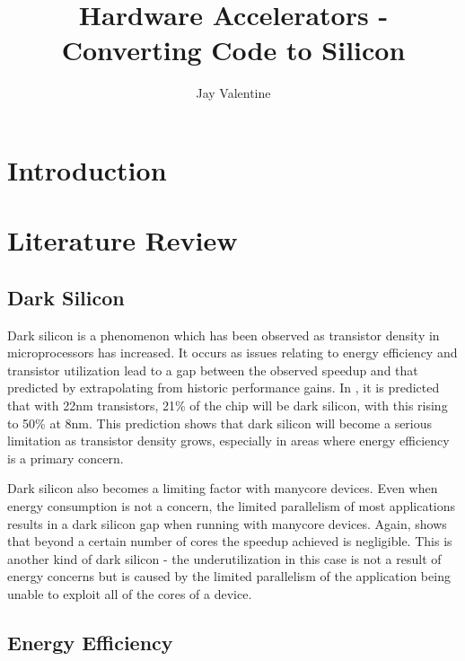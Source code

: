 \documentclass{report}
\begin{document}
\title{Hardware Accelerators - Converting Code to Silicon}
\author{Jay Valentine}

\maketitle

\begin{abstract}
\end{abstract}

\chapter*{Introduction}

\chapter*{Literature Review}

\section{Dark Silicon}

Dark silicon is a phenomenon which has been observed as transistor density in microprocessors has increased.
It occurs as issues relating to energy efficiency and transistor utilization lead to a gap between the observed speedup and that
predicted by extrapolating from historic performance gains. In \cite{darksilicon}, it is predicted that with 22nm transistors,
21\% of the chip will be dark silicon, with this rising to 50\% at 8nm. This prediction shows that dark silicon will become a
serious limitation as transistor density grows, especially in areas where energy efficiency is a primary concern.

Dark silicon also becomes a limiting factor with manycore devices. Even when energy consumption is not a concern, the limited
parallelism of most applications results in a dark silicon gap when running with manycore devices. Again, \cite{darksilicon} shows
that beyond a certain number of cores the speedup achieved is negligible. This is another kind of dark silicon - the
underutilization in this case is not a result of energy concerns but is caused by the limited parallelism of the application being
unable to exploit all of the cores of a device.

\section{Energy Efficiency}
\end{document}
